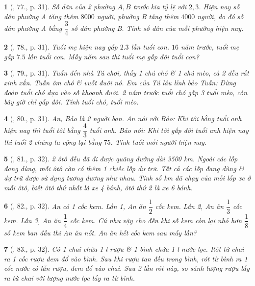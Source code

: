 \documentclass{article}
\newtheorem{baitoan}{}
\begin{document}
\begin{baitoan}[\cite{Binh_Toan_6_tap_2}, 77., p. 31]
	Số dân của 2 phường $A,B$ trước kia tỷ lệ với $2,3$. Hiện nay số dân phường A tăng thêm $8000$ người, phường B tăng thêm $4000$ người, do đó số dân phường A bằng $\dfrac{3}{4}$ số dân phường B. Tính số dân của mỗi phường hiện nay.
\end{baitoan}

\begin{baitoan}[\cite{Binh_Toan_6_tap_2}, 78., p. 31]
	Tuổi mẹ hiện nay gấp $2.3$ lần tuổi con. $16$ năm trước, tuổi mẹ gấp $7.5$ lần tuổi con. Mấy năm sau thì tuổi mẹ gấp đôi tuổi con?
\end{baitoan}

\begin{baitoan}[\cite{Binh_Toan_6_tap_2}, 79., p. 31]
	Tuấn đến nhà Tú chơi, thấy 1 chú chó \& 1 chú mèo, cả 2 đều rất xinh xắn. Tuấn ôm chó \& vuốt đuôi nó. Em của Tú láu lỉnh bảo Tuấn: Đừng đoán tuổi chó dựa vào số khoanh đuôi. 2 năm trước tuổi chó gấp 3 tuổi mèo, còn bây giờ chỉ gấp đôi. Tính tuổi chó, tuổi mèo.
\end{baitoan}

\begin{baitoan}[\cite{Binh_Toan_6_tap_2}, 80., p. 31]
	An, Bảo là 2 người bạn. An nói với Bảo: Khi tôi bằng tuổi anh hiện nay thì tuổi tôi bằng $\dfrac{4}{3}$ tuổi anh. Bảo nói: Khi tôi gấp đôi tuổi anh hiện nay thì tuổi 2 chúng ta cộng lại bằng $75$. Tính tuổi mỗi người hiện nay.
\end{baitoan}

\begin{baitoan}[\cite{Binh_Toan_6_tap_2}, 81., p. 32]
	2 ôtô đều đã đi được quãng đường dài {\rm3500 km}. Ngoài các lốp đang dùng, mỗi ôtô còn có thêm 1 chiếc lốp dự trữ. Tất cả các lốp đang dùng \& dự trữ được sử dụng tương đương như nhau. Tính số {\rm km} đã chạy của mỗi lốp xe ở mỗi ôtô, biết ôtô thứ nhất là xe 4 bánh, ôtô thứ 2 là xe 6 bánh.
\end{baitoan}

\begin{baitoan}[\cite{Binh_Toan_6_tap_2}, 82., p. 32]
	An có 1 cốc kem. Lần 1, An ăn $\dfrac{1}{2}$ cốc kem. Lần 2, An ăn $\dfrac{1}{3}$ cốc kem. Lần 3, An ăn $\dfrac{1}{4}$ cốc kem. Cứ như vậy cho đến khi số kem còn lại nhỏ hơn $\dfrac{1}{8}$  số kem ban đầu thi An ăn nốt. An ăn hết cốc kem sau mấy lần?
\end{baitoan}

\begin{baitoan}[\cite{Binh_Toan_6_tap_2}, 83., p. 32]
	Có 1 chai chứa {\rm1 l} rượu \& 1 bình chứa {\rm1 l} nước lọc. Rót từ chai ra 1 cốc rượu đem đổ vào bình. Sau khi rượu tan đều trong bình, rót từ bình ra 1 cốc nước có lẫn rượu, đem đổ vào chai. Sau 2 lần rót này, so sánh lượng rượu lấy ra từ chai với lượng nước lọc lấy ra từ bình.
\end{baitoan}
\end{document}
